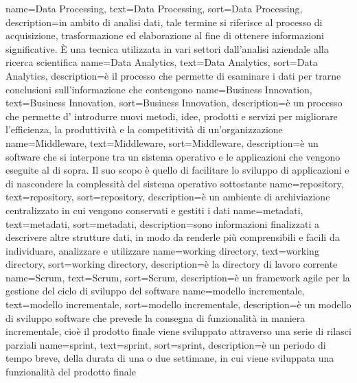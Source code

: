 {
    name={Data Processing},
    text=Data Processing,
    sort=Data Processing,
    description={in ambito di analisi dati, tale termine si riferisce al processo di acquisizione, trasformazione ed elaborazione al fine di 
    ottenere informazioni significative. È una tecnica utilizzata in vari settori dall'analisi aziendale alla ricerca scientifica}
}
{
    name={Data Analytics},
    text=Data Analytics,
    sort=Data Analytics,
    description={è il processo che permette di esaminare i dati per trarne conclusioni sull'informazione che contengono}
}
{
    name={Business Innovation},
    text=Business Innovation,
    sort=Business Innovation,
    description={è un processo che permette d' introdurre nuovi metodi, idee, prodotti e servizi per migliorare l'efficienza, la produttività e la competitività di un'organizzazione}
}
{
    name={Middleware},
    text=Middleware,
    sort=Middleware,
    description={è un software che si interpone tra un sistema operativo e le applicazioni che vengono eseguite al di sopra. Il suo scopo è quello di facilitare lo sviluppo di applicazioni e di nascondere la complessità del sistema operativo sottostante}
}
{
    name={repository},
    text=repository,
    sort=repository,
    description={è un ambiente di archiviazione centralizzato in cui vengono conservati e gestiti i dati}
}
{
    name={metadati},
    text=metadati,
    sort=metadati,
    description={sono informazioni finalizzati a descrivere altre strutture dati, in modo da renderle più comprensibili e facili da individuare, analizzare e utilizzare}
}
{
    name={working directory},
    text=working directory,
    sort=working directory,
    description={è la directory di lavoro corrente}
}
{
    name={Scrum},
    text=Scrum,
    sort=Scrum,
    description={è un framework agile per la gestione del ciclo di sviluppo del software}
}
{
    name={modello incrementale},
    text=modello incrementale,
    sort=modello incrementale,
    description={è un modello di sviluppo software che prevede la consegna di funzionalità in maniera incrementale, cioè il prodotto finale viene 
    sviluppato attraverso una serie di rilasci parziali}
}
{
    name={sprint},
    text=sprint,
    sort=sprint,
    description={è un periodo di tempo breve, della durata di una o due settimane, in cui viene sviluppata 
    una funzionalità del prodotto finale}
}
